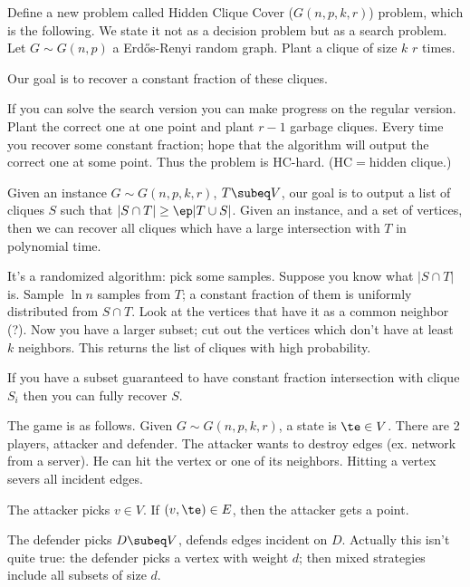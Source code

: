Define a new problem called Hidden Clique Cover ($G(n,p,k,r)$) problem, which is the following. We state it not as a decision problem but as a search problem. Let $G\sim G(n,p)$ a Erd\H os-Renyi random graph. Plant a clique of size $k$ $r$ times.

Our goal is to recover a constant fraction of these cliques.

If you can solve the search version you can make progress on the regular version. Plant the correct one at one point and plant $r-1$ garbage cliques. Every time you recover some constant fraction; hope that the algorithm will output the correct one at some point. Thus the problem is HC-hard. (HC$=$hidden clique.)

Given an instance $G\sim G(n,p,k,r)$, $T\subeq V$, our goal is to output a list of cliques $S$ such that $|S\cap T|\ge \ep|T\cup S|$. Given an instance, and a set of vertices, then we can recover all cliques which have a large intersection with $T$ in polynomial time.


It's a randomized algorithm: pick some samples. Suppose you know what $|S\cap T|$ is. Sample $\ln n$ samples from $T$; a constant fraction of them is uniformly distributed from $S\cap T$. Look at the vertices that have it as a common neighbor (?). Now you have a larger subset; cut out the vertices which don't have at least $k$ neighbors. This returns the list of cliques with high probability.

If you have a subset guaranteed to have constant fraction intersection with clique $S_i$ then you can fully recover $S$.

The game is as follows. Given $G\sim G(n,p,k,r)$, a state is $\te\in V$. There are 2 players, attacker and defender. The attacker wants to destroy edges (ex. network from a server). He can hit the vertex or one of its neighbors. Hitting a vertex severs all incident edges.

The attacker picks $v\in V$. If $(v,\te)\in E$, then the attacker gets a point.

The defender picks $D\subeq V$, defends edges incident on $D$. Actually this isn't quite true: the defender picks a vertex with weight $d$; then mixed strategies include all subsets of size $d$.

